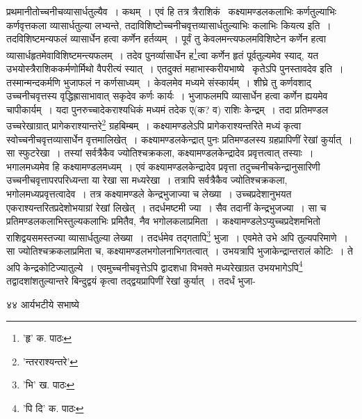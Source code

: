 \documentclass[11pt, openany]{book}
\begin{document}
{{{{{\vspace{0.3cm}
\noindent प्रथमानीतोच्चनीचव्यासार्धतुल्यैव~। कथम्~। एवं हि तत्र त्रैराशिकं  \textendash\
कक्ष्यामण्डलकलाभिः कर्णतुल्याभिः कर्णवृत्तकला व्यासार्धतुल्या लभ्यन्ते, तदाविशिष्टोच्चनीचवृत्तव्यासार्धतुल्याभिः कलाभिः कियत्य इति~।
तदविशिष्टमन्यफलं व्यासार्धेन हत्वा कर्णेन हर्तव्यम्~। पूर्वं तु केवलमन्त्यफलमविशिष्टेन कर्णेन हत्वा व्यासार्धहृतमेवाविशिष्टमन्त्यफलम्~। तदेव
पुनर्व्यासार्धेन ह\renewcommand{\thefootnote}{१}\footnote{'हृ' क. पाठः}त्वा कर्णेन हृतं पूर्वतुल्यमेव स्याद्, यत
उभयोस्त्रैराशिककर्मणोर्मिथो वैपरीत्यं स्यात्~। एतदुक्तं महाभास्करीयभाष्ये  \textendash\ {\qt कृतेऽपि पुनस्तावदेव} इति~।
तस्मान्मन्दकर्मणि भुजाफलं न कर्णसाध्यम्~। केवलमेव मध्यमे संस्कार्यम्~। शीघ्रे तु कर्णवशाद् उच्चनीचवृत्तस्य वृद्धिह्रासाभावात् सकृदेव कर्णः कार्यः~। भुजाफलमपि व्यासार्धेन हत्वा कर्णेन ह्ययमेव चापीकार्यम्~। यदा पुनरुच्चादेकराश्यधिकं मध्यमं तदेक ए(क? व) राशिः केन्द्रम्~। तदा प्रतिमण्डल उच्चरेखाग्रात् प्रागेकराश्यान्तरे\renewcommand{\thefootnote}{२}\footnote{'न्तरराश्यन्तरे'} ग्रहबिम्बम्~।
कक्ष्यामण्डलेऽपि प्रागेकराश्यन्तरिते मध्यं कृत्वा स्वोच्चनीचवृत्तव्यासार्धेन वृत्तमालिखेत्~। कक्ष्यामण्डलकेन्द्रात् पुनः प्रतिमण्डलस्य ग्रहप्रापिणीं रेखां कुर्यात्~। सा स्फुटरेखा~। तस्यां सर्वत्रैकैव ज्योतिश्चक्रकला, कक्ष्यामण्डलकेन्द्रादेव प्रवृत्तत्वात् तस्याः~। भगालमध्यमेव हि कक्ष्यामण्डलमध्यम्~। एवं कक्ष्यामण्डलकेन्द्रादेव प्रवृत्ता तदुच्चनीचकेन्द्रानुसारिणी उच्चनीचवृत्तापरपरिध्यन्ता या रेखा सा मध्यरेखा~। तत्रापि सर्वत्रैकैव ज्योतिश्चक्रकला, भगोलमध्यप्रवृत्तत्वादेव~। तत्र कक्ष्यामण्डले केन्द्रभुजाज्या च लेख्या~। उच्चप्रदेशानुभयत एकराश्यन्तरितप्रदेशोभयाग्रां रेखां लिखेत्~। तदर्धमष्टमी ज्या~। सैव तदानीं केन्द्रभुजज्या~। सा च प्रतिमण्डलकलाभिस्तुल्यकलाभिः प्रमितैव, नैव भगोलकलाप्रमिता~। कक्ष्यामण्डलेऽप्युच्चप्रदेशमभितो राशिद्वयसमस्तज्या व्यासार्धतुल्या लेख्या~। तदर्धमेव तद्गतापि\renewcommand{\thefootnote}{३}\footnote{'भि' ख. पाठः} भुजा~। एवमेते उभे अपि
तुल्यपरिमाणे~। सा ज्योतिश्चक्रकलाप्रमिता च, कक्ष्यामण्डलभगोलनाभिगतत्वात्~। उभयत्रापि भुजाकेन्द्रान्तरालं कोटिः~। ते अपि केन्द्रकोटिज्यातुल्ये~। एवमुच्चनीचवृत्तेऽपि द्वादशधा विभक्ते मध्यरेखाग्रत उभयभागेऽपि\renewcommand{\thefootnote}{४}\footnote{'पि दि' क. पाठः} तद्वादशांशतुल्यान्तरे बिन्दुद्वयं कृत्वा तद्द्वयप्रापिणीं रेखां कुर्यात्~। तदर्धं भुजा-

\newpage

\vspace{3cm} ४४ \hspace{4cm}आर्यभटीये सभाष्ये

}}}}}
\end{document}
